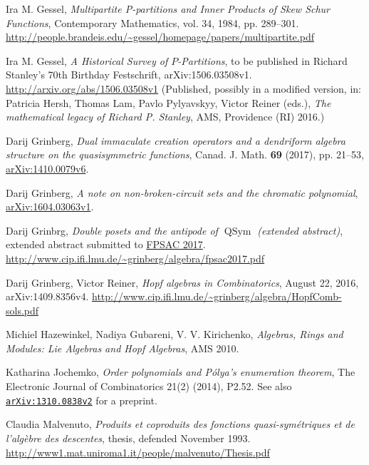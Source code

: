 \documentclass[12pt]{article}
\theoremstyle{plain}
\theoremstyle{definition}
\theoremstyle{remark}
\newcommand{\QSym}{{\operatorname{QSym}}}
\begin{document}
\begin{thebibliography}{10}
Ira M. Gessel, \textit{Multipartite
P-partitions and Inner Products of Skew Schur Functions}, Contemporary
Mathematics, vol. 34, 1984, pp. 289--301.\newline%
\url{http://people.brandeis.edu/~gessel/homepage/papers/multipartite.pdf}

Ira M. Gessel, \textit{A Historical Survey of
$P$-Partitions}, to be published in Richard Stanley's 70th Birthday Festschrift,
arXiv:1506.03508v1.\newline
\url{http://arxiv.org/abs/1506.03508v1}
\newline (Published, possibly in a modified version, in:
Patricia Hersh, Thomas Lam, Pavlo Pylyavskyy, Victor Reiner (eds.),
\textit{The mathematical legacy of Richard P. Stanley},
AMS, Providence (RI) 2016.)

Darij Grinberg,
\textit{Dual immaculate creation operators and a dendriform algebra
structure on the quasisymmetric functions},
Canad. J. Math. \textbf{69} (2017), pp. 21--53,
\href{http://arxiv.org/abs/1410.0079v6}{arXiv:1410.0079v6}.

Darij Grinberg,
\textit{A note on non-broken-circuit sets and the chromatic polynomial},
\href{https://arxiv.org/abs/1604.03063v1}{arXiv:1604.03063v1}.

Darij Grinbrg, \textit{Double posets and the antipode of $\QSym$
(extended abstract)},
extended abstract submitted to \href{https://sites.google.com/site/fpsac2017/}{FPSAC 2017}.
\url{http://www.cip.ifi.lmu.de/~grinberg/algebra/fpsac2017.pdf}

Darij Grinberg, Victor Reiner, \textit{Hopf algebras
in Combinatorics}, August 22, 2016, arXiv:1409.8356v4.\newline
\url{http://www.cip.ifi.lmu.de/~grinberg/algebra/HopfComb-sols.pdf}

Michiel Hazewinkel, Nadiya Gubareni, V. V. Kirichenko,
\textit{Algebras, Rings and Modules: Lie Algebras and Hopf Algebras},
AMS 2010.

Katharina Jochemko, \textit{Order polynomials and
P\'{o}lya's enumeration theorem},
The Electronic Journal of Combinatorics 21(2) (2014), P2.52.
See also
\texttt{\href{http://arxiv.org/abs/1310.0838v2}{arXiv:1310.0838v2}}
for a preprint.

Claudia Malvenuto, \textit{Produits et
coproduits des fonctions quasi-sym\'{e}triques et de l'alg\`{e}bre des
descentes}, thesis, defended November 1993.\newline
\url{http://www1.mat.uniroma1.it/people/malvenuto/Thesis.pdf}


\end{thebibliography}
\end{document}

